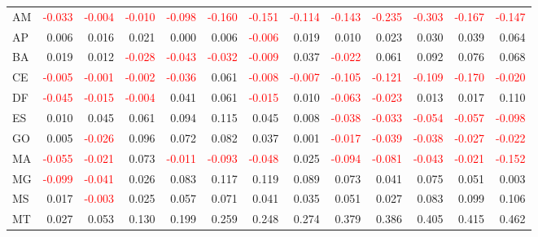 \documentclass[a4paper,preprint,11pt,authoryear]{elsarticle}
\begin{document}
\begin{table}
{\begin{tabular}{lrrrrrrrrrrrr}
      AM & \textcolor{red}{-0.033} & \textcolor{red}{-0.004} & \textcolor{red}{-0.010} & \textcolor{red}{-0.098} & \textcolor{red}{-0.160} & \textcolor{red}{-0.151} & \textcolor{red}{-0.114} & \textcolor{red}{-0.143} & \textcolor{red}{-0.235} & \textcolor{red}{-0.303} & \textcolor{red}{-0.167} & \textcolor{red}{-0.147} \\
      AP & 0.006 & 0.016 & 0.021 & 0.000 & 0.006 & \textcolor{red}{-0.006} & 0.019 & 0.010 & 0.023 & 0.030 & 0.039 & 0.064 \\
      BA & 0.019 & 0.012 & \textcolor{red}{-0.028} & \textcolor{red}{-0.043} & \textcolor{red}{-0.032} & \textcolor{red}{-0.009} & 0.037 & \textcolor{red}{-0.022} & 0.061 & 0.092 & 0.076 & 0.068 \\
      CE & \textcolor{red}{-0.005} & \textcolor{red}{-0.001} & \textcolor{red}{-0.002} & \textcolor{red}{-0.036} & 0.061 & \textcolor{red}{-0.008} & \textcolor{red}{-0.007} & \textcolor{red}{-0.105} & \textcolor{red}{-0.121} & \textcolor{red}{-0.109} & \textcolor{red}{-0.170} & \textcolor{red}{-0.020} \\
      DF & \textcolor{red}{-0.045} & \textcolor{red}{-0.015} & \textcolor{red}{-0.004} & 0.041 & 0.061 & \textcolor{red}{-0.015} & 0.010 & \textcolor{red}{-0.063} & \textcolor{red}{-0.023} & 0.013 & 0.017 & 0.110 \\
      ES & 0.010 & 0.045 & 0.061 & 0.094 & 0.115 & 0.045 & 0.008 & \textcolor{red}{-0.038} & \textcolor{red}{-0.033} & \textcolor{red}{-0.054} & \textcolor{red}{-0.057} & \textcolor{red}{-0.098} \\
      GO & 0.005 & \textcolor{red}{-0.026} & 0.096 & 0.072 & 0.082 & 0.037 & 0.001 & \textcolor{red}{-0.017} & \textcolor{red}{-0.039} & \textcolor{red}{-0.038} & \textcolor{red}{-0.027} & \textcolor{red}{-0.022} \\
      MA & \textcolor{red}{-0.055} & \textcolor{red}{-0.021} & 0.073 & \textcolor{red}{-0.011} & \textcolor{red}{-0.093} & \textcolor{red}{-0.048} & 0.025 & \textcolor{red}{-0.094} & \textcolor{red}{-0.081} & \textcolor{red}{-0.043} & \textcolor{red}{-0.021} & \textcolor{red}{-0.152} \\
      MG & \textcolor{red}{-0.099} & \textcolor{red}{-0.041} & 0.026 & 0.083 & 0.117 & 0.119 & 0.089 & 0.073 & 0.041 & 0.075 & 0.051 & 0.003 \\
      MS & 0.017 & \textcolor{red}{-0.003} & 0.025 & 0.057 & 0.071 & 0.041 & 0.035 & 0.051 & 0.027 & 0.083 & 0.099 & 0.106 \\
      MT & 0.027 & 0.053 & 0.130 & 0.199 & 0.259 & 0.248 & 0.274 & 0.379 & 0.386 & 0.405 & 0.415 & 0.462 \\

\end{tabular}}
\end{table}
\end{document}
